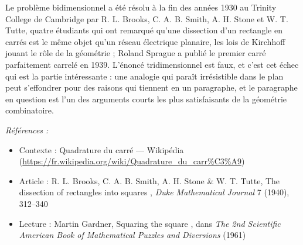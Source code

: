 \documentclass[11pt]{article}
\newenvironment{refs}{\par\small\noindent\emph{Références :}\begin{itemize}\setlength\itemsep{0pt}}{\end{itemize}\normalsize}
\begin{document}
\noindent Le problème bidimensionnel a été résolu à la fin des années 1930 au Trinity College de Cambridge par R. L. Brooks, C. A. B. Smith, A. H. Stone et W. T. Tutte, quatre étudiants qui ont remarqué qu'une dissection d'un rectangle en carrés est le même objet qu'un réseau électrique planaire, les lois de Kirchhoff jouant le rôle de la géométrie ; Roland Sprague a publié le premier carré parfaitement carrelé en 1939. L'énoncé tridimensionnel est faux, et c'est cet échec qui est la partie intéressante : une analogie qui paraît irrésistible dans le plan peut s'effondrer pour des raisons qui tiennent en un paragraphe, et le paragraphe en question est l'un des arguments courts les plus satisfaisants de la géométrie combinatoire.

\begin{refs}
\item Contexte : Quadrature du carré --- Wikipédia (\url{https://fr.wikipedia.org/wiki/Quadrature_du_carr%C3%A9})
\item Article : R. L. Brooks, C. A. B. Smith, A. H. Stone \& W. T. Tutte, \og{} The dissection of rectangles into squares \fg{}, \textit{Duke Mathematical Journal} 7 (1940), 312--340
\item Lecture : Martin Gardner, \og{} Squaring the square \fg{}, dans \textit{The 2nd Scientific American Book of Mathematical Puzzles and Diversions} (1961)
\end{refs}

\bigskip
\end{document}
